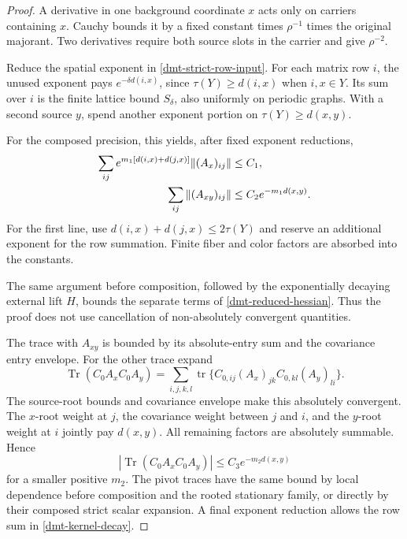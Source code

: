 \documentclass[11pt]{article}
\theoremstyle{remark}
\begin{document}
\begin{proof}
A derivative in one background coordinate \(x\) acts only
on carriers containing \(x\). Cauchy bounds it by a fixed
constant times \(\rho^{-1}\) times the original majorant.
Two derivatives require both source slots in the carrier
and give \(\rho^{-2}\).

Reduce the spatial exponent in
\eqref{dmt-strict-row-input}. For each matrix row \(i\),
the unused exponent pays \(e^{-\delta d(i,x)}\), since
\(\tau(Y)\ge d(i,x)\) when \(i,x\in Y\). Its sum over
\(i\) is the finite lattice bound \(S_\delta\), also
uniformly on periodic graphs. With a second source \(y\),
spend another exponent portion on
\(\tau(Y)\ge d(x,y)\).

For the composed precision, this yields, after fixed
exponent reductions,
\begin{align}
 \sum_{ij}e^{m_1[d(i,x)+d(j,x)]}
                   \|(A_x)_{ij}\|&\le C_1,\notag\\
 \sum_{ij}\|(A_{xy})_{ij}\|
                   &\le C_2e^{-m_1d(x,y)}.
 \label{dmt-entry-source-bounds}
\end{align}
For the first line, use
\(d(i,x)+d(j,x)\le2\tau(Y)\) and reserve an additional
exponent for the row summation. Finite fiber and color
factors are absorbed into the constants.

The same argument before composition, followed by the
exponentially decaying external lift \(H\), bounds the
separate terms of \eqref{dmt-reduced-hessian}. Thus the
proof does not use cancellation of non-absolutely
convergent quantities.

The trace with \(A_{xy}\) is bounded by its absolute-entry
sum and the covariance entry envelope. For the other
trace expand
\begin{equation}
 \operatorname{Tr}(C_0A_xC_0A_y)
 =\sum_{i,j,k,l}\operatorname{tr}
     \{C_{0,ij}(A_x)_{jk}C_{0,kl}(A_y)_{li}\}.
 \label{dmt-trace-expansion}
\end{equation}
The source-root bounds and covariance envelope make this
absolutely convergent. The \(x\)-root weight at \(j\),
the covariance weight between \(j\) and \(i\), and the
\(y\)-root weight at \(i\) jointly pay \(d(x,y)\).
All remaining factors are absolutely summable. Hence
\[
 |\operatorname{Tr}(C_0A_xC_0A_y)|
                         \le C_3e^{-m_2d(x,y)}
\]
for a smaller positive \(m_2\). The pivot traces have the
same bound by local dependence before composition and the
rooted stationary family, or directly by their composed
strict scalar expansion. A final exponent reduction
allows the row sum in \eqref{dmt-kernel-decay}.
\end{proof}
\end{document}
